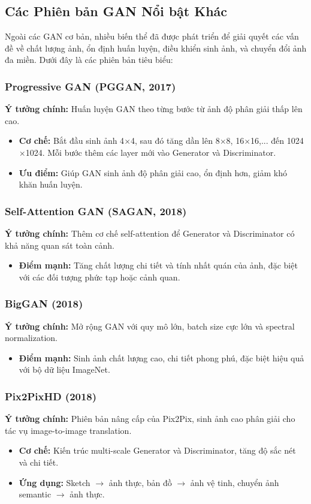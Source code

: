 \subsection{Các Phiên bản GAN Nổi bật Khác}
\label{subsec:advanced_gans}

Ngoài các GAN cơ bản, nhiều biến thể đã được phát triển để giải quyết các vấn đề về chất lượng ảnh, ổn định huấn luyện, điều khiển sinh ảnh, và chuyển đổi ảnh đa miền. Dưới đây là các phiên bản tiêu biểu:

\subsubsection{Progressive GAN (PGGAN, 2017)}
\textbf{Ý tưởng chính:} Huấn luyện GAN theo từng bước từ ảnh độ phân giải thấp lên cao.
\begin{itemize}
	\item \textbf{Cơ chế:} Bắt đầu sinh ảnh 4$\times$4, sau đó tăng dần lên 8$\times$8, 16$\times$16,... đến 1024$\times$1024. Mỗi bước thêm các layer mới vào Generator và Discriminator.
	\item \textbf{Ưu điểm:} Giúp GAN sinh ảnh độ phân giải cao, ổn định hơn, giảm khó khăn huấn luyện.
\end{itemize}

\subsubsection{Self-Attention GAN (SAGAN, 2018)}
\textbf{Ý tưởng chính:} Thêm cơ chế self-attention để Generator và Discriminator có khả năng quan sát toàn cảnh.
\begin{itemize}
	\item \textbf{Điểm mạnh:} Tăng chất lượng chi tiết và tính nhất quán của ảnh, đặc biệt với các đối tượng phức tạp hoặc cảnh quan.
\end{itemize}

\subsubsection{BigGAN (2018)}
\textbf{Ý tưởng chính:} Mở rộng GAN với quy mô lớn, batch size cực lớn và spectral normalization.
\begin{itemize}
	\item \textbf{Điểm mạnh:} Sinh ảnh chất lượng cao, chi tiết phong phú, đặc biệt hiệu quả với bộ dữ liệu ImageNet.
\end{itemize}

\subsubsection{Pix2PixHD (2018)}
\textbf{Ý tưởng chính:} Phiên bản nâng cấp của Pix2Pix, sinh ảnh cao phân giải cho tác vụ image-to-image translation.
\begin{itemize}
	\item \textbf{Cơ chế:} Kiến trúc multi-scale Generator và Discriminator, tăng độ sắc nét và chi tiết.
	\item \textbf{Ứng dụng:} Sketch $\rightarrow$ ảnh thực, bản đồ $\rightarrow$ ảnh vệ tinh, chuyển ảnh semantic $\rightarrow$ ảnh thực.
\end{itemize}

